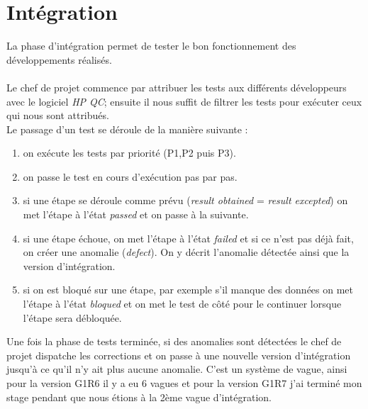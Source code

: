 \section{Intégration}
La phase d'intégration permet de tester le bon fonctionnement des développements réalisés.
\\\\
Le chef de projet commence par attribuer les tests aux différents développeurs avec le logiciel \textit{HP QC}; ensuite il nous suffit de filtrer les tests pour exécuter ceux qui nous sont attribués.
\\Le passage d'un test se déroule de la manière suivante :
\begin{enumerate}
\item on exécute les tests par priorité (P1,P2 puis P3).
\item on passe le test en cours d'exécution pas par pas.
\item si une étape se déroule comme prévu (\textit{result obtained} = \textit{result excepted}) on met l'étape à l'état \textit{passed} et on passe à la suivante.
\item si une étape échoue, on met l'étape à l'état \textit{failed} et si ce n'est pas déjà fait, on créer une anomalie (\textit{defect}). On y décrit l'anomalie détectée ainsi que la version d'intégration.
\item si on est bloqué sur une étape, par exemple s'il manque des données on met l'étape à l'état \textit{bloqued} et on
 met le test de côté pour le continuer lorsque l'étape sera débloquée.\\
 \end{enumerate}

 Une fois la phase de tests terminée, si des anomalies sont détectées le chef de projet dispatche les corrections et on passe à une nouvelle version d'intégration jusqu'à ce qu'il n'y ait plus aucune anomalie. C'est un système de vague, ainsi pour la version G1R6 il y a eu 6 vagues et pour la version G1R7 j'ai terminé mon stage pendant que nous étions à la 2ème vague d'intégration.

